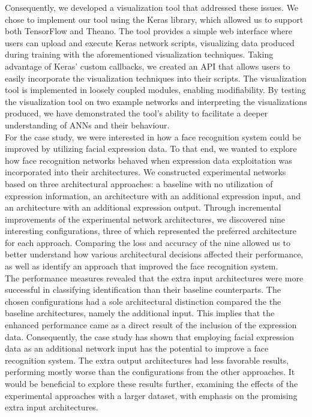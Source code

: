 \noindent Consequently, we developed a visualization tool that addressed these issues. We chose to implement our tool using the Keras library, which allowed us to support both TensorFlow and Theano. The tool provides a simple web interface where users can upload and execute Keras network scripts, visualizing data produced during training with the aforementioned visualization techniques. Taking advantage of Keras' custom callbacks, we created an API that allows users to easily incorporate the visualization techniques into their scripts. The visualization tool is implemented in loosely coupled modules, enabling modifiability. By testing the visualization tool on two example networks and interpreting the visualizations produced, we have demonstrated the tool's ability to facilitate a deeper understanding of ANNs and their behaviour. \\

\noindent For the case study, we were interested in how a face recognition system could be improved by utilizing facial expression data. To that end, we wanted to explore how face recognition networks behaved when expression data exploitation was incorporated into their architectures. We constructed experimental networks based on three architectural approaches: a baseline with no utilization of expression information, an architecture with an additional expression input, and an architecture with an additional expression output. Through incremental improvements of the experimental network architectures, we discovered nine interesting configurations, three of which represented the preferred architecture for each approach. Comparing the loss and accuracy of the nine allowed us to better understand how various architectural decisions affected their performance, as well as identify an approach that improved the face recognition system. \\

\noindent The performance measures revealed that the extra input architectures were more successful in classifying identification than their baseline counterparts. The chosen configurations had a sole architectural distinction compared the the baseline architectures, namely the additional input. This implies that the enhanced performance came as a direct result of the inclusion of the expression data. Consequently, the case study has shown that employing facial expression data as an additional network input has the potential to improve a face recognition system. The extra output architectures had less favorable results, performing mostly worse than the configurations from the other approaches. It would be beneficial to explore these results further, examining the effects of the experimental approaches with a larger dataset, with emphasis on the promising extra input architectures. \\

